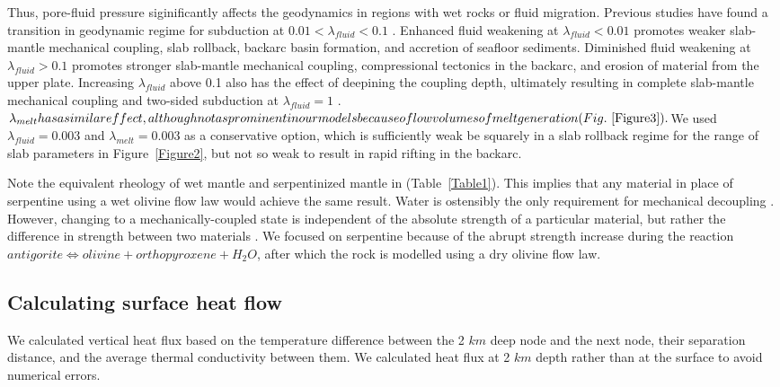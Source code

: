 \documentclass[draft]{agujournal2019}
\begin{document}
{ Thus, pore-fluid pressure siginificantly affects the geodynamics in regions with wet rocks or fluid migration. Previous studies have found a transition in geodynamic regime for subduction at $0.01 < \lambda_{fluid} < 0.1$ \cite{Sizova2010, Gerya2011, Vogt2012}. Enhanced fluid weakening at $\lambda_{fluid} < 0.01$ promotes weaker slab-mantle mechanical coupling, slab rollback, backarc basin formation, and accretion of seafloor sediments. Diminished fluid weakening at $\lambda_{fluid} > 0.1$ promotes stronger slab-mantle mechanical coupling, compressional tectonics in the backarc, and erosion of material from the upper plate. Increasing $\lambda_{fluid}$ above 0.1 also has the effect of deepining the coupling depth, ultimately resulting in complete slab-mantle mechanical coupling and two-sided subduction at $\lambda_{fluid} = 1$ \cite{Gerya2008}. $\lambda_{melt} has a similar effect, although not as prominent in our models because of low volumes of melt generation (Fig.~\ref{Figure3}). $We used $\lambda_{fluid} = 0.003$ and $\lambda_{melt} = 0.003$ as a conservative option, which is sufficiently weak be squarely in a slab rollback regime for the range of slab parameters in Figure~\ref{Figure2}, but not so weak to result in rapid rifting in the backarc.

 Note the equivalent rheology of wet mantle and serpentinized mantle in (Table~\ref{Table1}). This implies that any material in place of serpentine using a wet olivine flow law would achieve the same result. Water is ostensibly the only requirement for mechanical decoupling \cite{Gerya2008}. However, changing to a mechanically-coupled state is independent of the absolute strength of a particular material, but rather the difference in strength between two materials \cite{Wada2008}.  We focused on serpentine because of the abrupt strength increase during the reaction $antigorite \allowbreak\Leftrightarrow olivine + orthopyroxene + H_{2}O$, after which the rock is modelled using a dry olivine flow law.
}

\subsection{Calculating surface heat flow}
We calculated vertical heat flux based on the temperature difference between the 2 $km$ deep node and the next  node, their separation distance, and the average thermal conductivity between them. We calculated heat flux at 2 $km$ depth rather than at the surface to avoid numerical errors.
\end{document}

